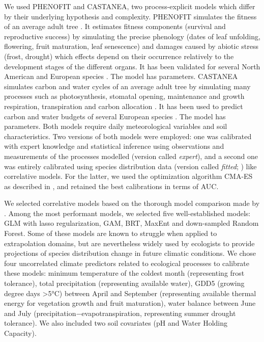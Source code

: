 We used PHENOFIT and CASTANEA, two process-explicit models which differ by their underlying hypothesis and complexity. PHENOFIT simulates the fitness of an average adult tree \citep{Chuine2001}. It estimates fitness components (survival and reproductive success) by simulating the precise phenology (dates of leaf unfolding, flowering, fruit maturation, leaf senescence) and damages caused by abiotic stress (frost, drought) which effects depend on their occurrence relatively to the development stages of the different organs. It has been validated for several North American and European species \citep{Morin2007, Saltre2013, Duputie2015, Gauzere2020}. The model has  parameters. CASTANEA simulates carbon and water cycles of an average adult tree by simulating many processes such as photosynthesis, stomatal opening, maintenance and growth respiration, transpiration and carbon allocation  \citep{Dufrene2005}. It has been used to predict carbon and water budgets of several European species \citep{Davi2006, Delpierre2012, Davi2017}. The model has  parameters. Both models require daily meteorological variables and soil characteristics. Two versions of both models were employed: one was calibrated with expert knowledge and statistical inference using observations and measurements of the processes modelled (version called \emph{expert}), and a second one was entirely calibrated using species distribution data (version called \emph{fitted}; \citealp{VanderMeersch2023}) like correlative models. For the latter, we used the optimization algorithm CMA-ES \citep{Hansen2001} as described in \citep{VanderMeersch2023}, and retained the best calibrations in terms of AUC.
  
We selected correlative models based on the thorough model comparison made by \cite{Valavi2022}. Among the most performant models, we selected five well-established models: GLM with lasso regularization, GAM, BRT, MaxEnt and down-sampled Random Forest. Some of these models are known to struggle when applied to extrapolation domains, but are nevertheless widely used by ecologists to provide projections of species distribution change in future climatic conditions.
We chose four uncorrelated climate predictors related to ecological processes to calibrate these models: minimum temperature of the coldest month (representing frost tolerance), total precipitation (representing available water), GDD5 (growing degree days  \textgreater5°C) between April and September (representing available thermal energy for vegetation growth and fruit maturation), water balance between June and July (precipitation$-$evapotranspiration, representing summer drought tolerance). We also included two soil covariates (pH and Water Holding Capacity).
  
